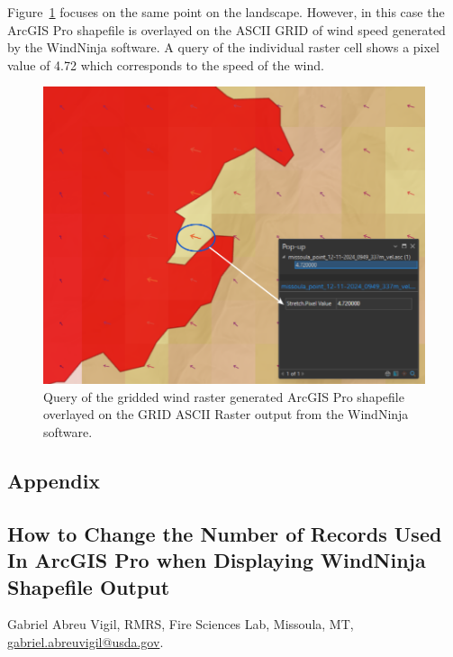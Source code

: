 \documentclass[12pt]{article}
\begin{document}
\newpage

Figure~\ref{fig:Figure15} focuses on the same point on the landscape. However, in this case the ArcGIS Pro shapefile is
overlayed on the ASCII GRID of wind speed generated by the WindNinja software. A query of the individual
raster cell shows a pixel value of 4.72 which corresponds to the speed of the wind.
\begin{figure}[H]
	\centering
	\includegraphics[scale=0.45]{arc_15.png}
	\caption{Query of the gridded wind raster generated ArcGIS Pro shapefile overlayed on the GRID ASCII Raster output from the WindNinja software.}
\label{fig:Figure15}
\end{figure}


\renewcommand{\thefigure}{\arabic{figure}}
\setcounter{figure}{0}

\pagebreak
\begin{centering}
\section*{Appendix}
\label{section:appendix}

\subsection*{How to Change the Number of Records Used In ArcGIS Pro when Displaying WindNinja Shapefile Output}
Gabriel Abreu Vigil, RMRS, Fire Sciences Lab, Missoula, MT, \href{mailto:gabriel.abreuvigil@usda.gov}{gabriel.abreuvigil@usda.gov}.
\end{centering}
\end{document}

